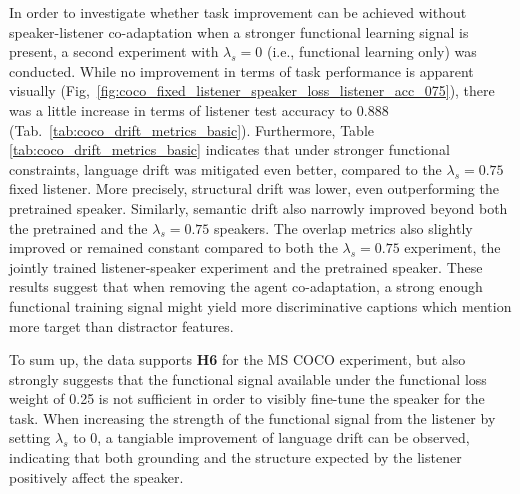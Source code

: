 In order to investigate whether task improvement can be achieved without speaker-listener co-adaptation when a stronger functional learning signal is present, a second experiment with $\lambda_s=0$ (i.e., functional learning only) was conducted. While no improvement in terms of task performance is apparent visually (Fig,~\ref{fig:coco_fixed_listener_speaker_loss_listener_acc_075}), there was a little increase in terms of listener test accuracy to 0.888 (Tab.~\ref{tab:coco_drift_metrics_basic}). Furthermore, Table \ref{tab:coco_drift_metrics_basic} indicates that under stronger functional constraints, language drift was mitigated even better, compared to the $\lambda_s = 0.75$ fixed listener. More precisely, structural drift was lower, even outperforming the pretrained speaker. Similarly, semantic drift also narrowly improved beyond both the pretrained and the $\lambda_s = 0.75$ speakers. 
The overlap metrics also slightly improved or remained constant compared to both the $\lambda_s=0.75$ experiment, the jointly trained listener-speaker experiment and the pretrained speaker. These results suggest that when removing the agent co-adaptation, a strong enough functional training signal might yield more discriminative captions which mention more target than distractor features. 

To sum up, the data supports \textbf{H6} for the MS COCO experiment, but also strongly suggests that the functional signal available under the functional loss weight of 0.25 is not sufficient in order to visibly fine-tune the speaker for the task. When increasing the strength of the functional signal from the listener by setting $\lambda_s$ to 0, a tangiable improvement of language drift can be observed, indicating that both grounding and the structure expected by the listener positively affect the speaker.

